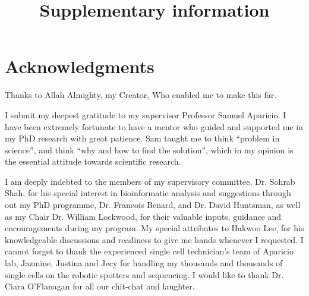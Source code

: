 

\makeatletter
\newcommand{\putFigLargCap}[5]
{
\begin{center}
\texttt{[image: \#1]}   
\bigskip
\setbox0\vbox{
\let\caption@rule\relax
\captionof{figure}[#5]{\textbf{#5} #3 \label{#4}}
\global\skip1\lastskip\unskip
\global\setbox1\lastbox

}
\unvbox0
\setbox0\hbox{\unhbox1\unskip\unskip\unpenalty
\global\setbox1\lastbox}
\unvbox1
\vskip\skip1
\end{center}
}
\makeatother





\title{Supplementary information}















\chapter{Acknowledgments}

Thanks to Allah Almighty, my Creator, Who enabled me to make this far.

I submit my deepest gratitude to my supervisor Professor Samuel Aparicio. I have been extremely fortunate to have a mentor who guided and supported me in my PhD research with great patience. Sam taught me to think “problem in science”, and think “why and how to find the solution”, which in my opinion is the essential attitude towards scientific research. 

I am deeply indebted to the members of my supervisory committee, Dr. Sohrab Shah, for his special interest in bioinformatic analysis and suggestions through out my PhD programme, Dr. Francois Benard, and Dr. David Huntsman, as well as my Chair Dr. William Lockwood, for their valuable inputs, guidance and encouragements during my program. My special attributes to Hakwoo Lee, for his knowledgeable discussions and  readiness to give me hands whenever I requested. I cannot forget to thank the experienced single cell technician's team of Aparicio lab, Jazmine, Justina and Jecy for handling my thousands and thousands of single cells on the robotic spotters and sequencing. I would like to thank Dr. Ciara O'Flanagan for all our chit-chat and laughter. 

